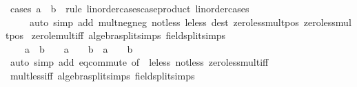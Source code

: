 \begin{isabellebody}
%
\isatagproof
{}\isamarkupfalse%
\ {\isacharparenleft}{\kern0pt}cases\ a\ {}\ b\ {}\ rule{\isacharcolon}{\kern0pt}\ linorder{\isacharunderscore}{\kern0pt}cases{\isacharbrackleft}{\kern0pt}case{\isacharunderscore}{\kern0pt}product\ linorder{\isacharunderscore}{\kern0pt}cases{\isacharbrackright}{\kern0pt}{\isacharparenright}{\kern0pt}\isanewline
\ \ \ \ \ {\isacharparenleft}{\kern0pt}auto\ simp\ add{\isacharcolon}{\kern0pt}\ mult{\isacharunderscore}{\kern0pt}neg{\isacharunderscore}{\kern0pt}neg\ not{\isacharunderscore}{\kern0pt}less\ le{\isacharunderscore}{\kern0pt}less\ dest{\isacharcolon}{\kern0pt}\ zero{\isacharunderscore}{\kern0pt}less{\isacharunderscore}{\kern0pt}mult{\isacharunderscore}{\kern0pt}pos\ zero{\isacharunderscore}{\kern0pt}less{\isacharunderscore}{\kern0pt}mult{\isacharunderscore}{\kern0pt}pos{}{\isacharparenright}{\kern0pt}%
\endisatagproof
{\isafoldproof}%
%
\isadelimproof
\isanewline
%
\endisadelimproof
\isanewline
{}\isamarkupfalse%
\ zero{\isacharunderscore}{\kern0pt}le{\isacharunderscore}{\kern0pt}mult{\isacharunderscore}{\kern0pt}iff\ {\isacharbrackleft}{\kern0pt}algebra{\isacharunderscore}{\kern0pt}split{\isacharunderscore}{\kern0pt}simps{\isacharcomma}{\kern0pt}\ field{\isacharunderscore}{\kern0pt}split{\isacharunderscore}{\kern0pt}simps{\isacharbrackright}{\kern0pt}{\isacharcolon}{\kern0pt}\isanewline
\ \ {\isachardoublequoteopen}{}\ {\isasymle}\ a\ {\isacharasterisk}{\kern0pt}\ b\ {\isasymlongleftrightarrow}\ {}\ {\isasymle}\ a\ {\isasymand}\ {}\ {\isasymle}\ b\ {\isasymor}\ a\ {\isasymle}\ {}\ {\isasymand}\ b\ {\isasymle}\ {}{\isachardoublequoteclose}\isanewline
%
\isadelimproof
\ \ %
\endisadelimproof
%
\isatagproof
{}\isamarkupfalse%
\ {\isacharparenleft}{\kern0pt}auto\ simp\ add{\isacharcolon}{\kern0pt}\ eq{\isacharunderscore}{\kern0pt}commute\ {\isacharbrackleft}{\kern0pt}of\ {}{\isacharbrackright}{\kern0pt}\ le{\isacharunderscore}{\kern0pt}less\ not{\isacharunderscore}{\kern0pt}less\ zero{\isacharunderscore}{\kern0pt}less{\isacharunderscore}{\kern0pt}mult{\isacharunderscore}{\kern0pt}iff{\isacharparenright}{\kern0pt}%
\endisatagproof
{\isafoldproof}%
%
\isadelimproof
\isanewline
%
\endisadelimproof
\isanewline
{}\isamarkupfalse%
\ mult{\isacharunderscore}{\kern0pt}less{\isacharunderscore}{\kern0pt}{}{\isacharunderscore}{\kern0pt}iff\ {\isacharbrackleft}{\kern0pt}algebra{\isacharunderscore}{\kern0pt}split{\isacharunderscore}{\kern0pt}simps{\isacharcomma}{\kern0pt}\ field{\isacharunderscore}{\kern0pt}split{\isacharunderscore}{\kern0pt}simps{\isacharbrackright}{\kern0pt}{\isacharcolon}{\kern0pt}\isanewline

\end{isabellebody}
